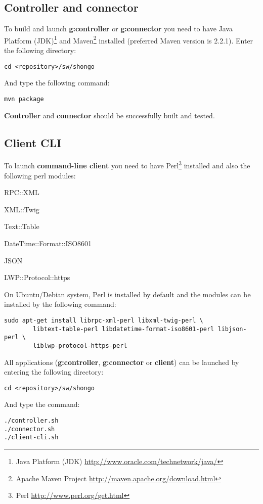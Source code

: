 \subsection{Controller and connector}
To build and launch \textbf{\gls{g:controller}} or \textbf{\gls{g:connector}} you need to have Java Platform (JDK)\footnote{Java Platform (JDK) \url{http://www.oracle.com/technetwork/java/}} and Maven\footnote{Apache Maven Project \url{http://maven.apache.org/download.html}} installed (preferred Maven version is 2.2.1). Enter the following directory:
\begin{verbatim}
cd <repository>/sw/shongo
\end{verbatim}
And type the following command:
\begin{verbatim}
mvn package
\end{verbatim}
\textbf{Controller} and \textbf{connector} should be successfully built and tested. 

\subsection{Client CLI}
To launch \textbf{command-line client} you need to have Perl\footnote{Perl \url{http://www.perl.org/get.html}} installed and also the following perl modules:
\begin{compactenum}
\item RPC::XML
\item XML::Twig
\item Text::Table
\item DateTime::Format::ISO8601
\item JSON
\item LWP::Protocol::https
\end{compactenum}
On Ubuntu/Debian system, Perl is installed by default and the modules
can be installed by the following command:
\begin{verbatim}
sudo apt-get install librpc-xml-perl libxml-twig-perl \
        libtext-table-perl libdatetime-format-iso8601-perl libjson-perl \
        liblwp-protocol-https-perl
\end{verbatim}
All applications (\textbf{\gls{g:controller}}, \textbf{\gls{g:connector}} or \textbf{client}) can be launched by entering the following directory:
\begin{verbatim}
cd <repository>/sw/shongo
\end{verbatim}
And type the  command:
\begin{verbatim}
./controller.sh
./connector.sh
./client-cli.sh
\end{verbatim}

